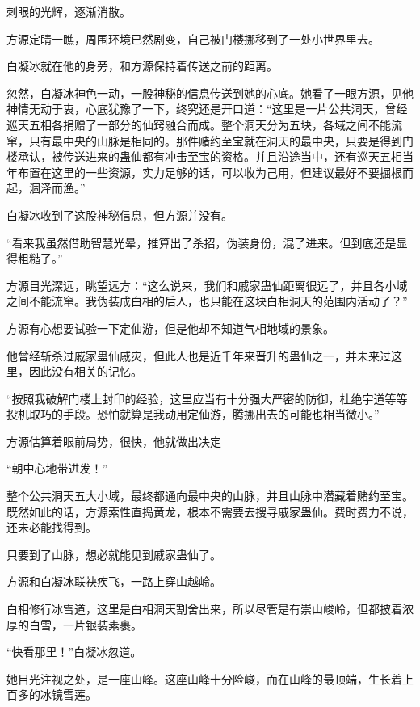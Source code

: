 
\begin{this_body}

刺眼的光辉，逐渐消散。

方源定睛一瞧，周围环境已然剧变，自己被门楼挪移到了一处小世界里去。

白凝冰就在他的身旁，和方源保持着传送之前的距离。

忽然，白凝冰神色一动，一股神秘的信息传送到她的心底。她看了一眼方源，见他神情无动于衷，心底犹豫了一下，终究还是开口道：“这里是一片公共洞天，曾经巡天五相各捐赠了一部分的仙窍融合而成。整个洞天分为五块，各域之间不能流窜，只有最中央的山脉是相同的。那件赌约至宝就在洞天的最中央，只要是得到门楼承认，被传送进来的蛊仙都有冲击至宝的资格。并且沿途当中，还有巡天五相当年布置在这里的一些资源，实力足够的话，可以收为己用，但建议最好不要掘根而起，涸泽而渔。”

白凝冰收到了这股神秘信息，但方源并没有。

“看来我虽然借助智慧光晕，推算出了杀招，伪装身份，混了进来。但到底还是显得粗糙了。”

方源目光深远，眺望远方：“这么说来，我们和戚家蛊仙距离很远了，并且各小域之间不能流窜。我伪装成白相的后人，也只能在这块白相洞天的范围内活动了？”

方源有心想要试验一下定仙游，但是他却不知道气相地域的景象。

他曾经斩杀过戚家蛊仙戚灾，但此人也是近千年来晋升的蛊仙之一，并未来过这里，因此没有相关的记忆。

“按照我破解门楼上封印的经验，这里应当有十分强大严密的防御，杜绝宇道等等投机取巧的手段。恐怕就算是我动用定仙游，腾挪出去的可能也相当微小。”

方源估算着眼前局势，很快，他就做出决定

“朝中心地带进发！”

整个公共洞天五大小域，最终都通向最中央的山脉，并且山脉中潜藏着赌约至宝。既然如此的话，方源索性直捣黄龙，根本不需要去搜寻戚家蛊仙。费时费力不说，还未必能找得到。

只要到了山脉，想必就能见到戚家蛊仙了。

方源和白凝冰联袂疾飞，一路上穿山越岭。

白相修行冰雪道，这里是白相洞天割舍出来，所以尽管是有崇山峻岭，但都披着浓厚的白雪，一片银装素裹。

“快看那里！”白凝冰忽道。

她目光注视之处，是一座山峰。这座山峰十分险峻，而在山峰的最顶端，生长着上百多的冰镜雪莲。


\end{this_body}
